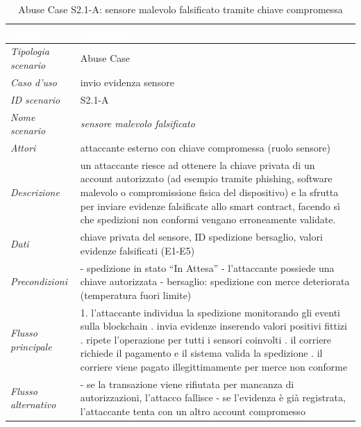 \begin{longtable}{| >{\columncolor{abuseCol}}p{} | p{} |}
\caption{Abuse Case S2.1-A: sensore malevolo falsificato tramite chiave compromessa}\label{tab:s21a}\\
\hline
\rowcolor{abuseHeader} \textcolor{white}{\textit{Campo}} & \textcolor{white}{\textit{Contenuto}} \\
\hline
\textit{Tipologia scenario} & Abuse Case \\
\hline
\textit{Caso d'uso} & invio evidenza sensore \\
\hline
\textit{ID scenario} & S2.1-A \\
\hline
\textit{Nome scenario} & \textit{sensore malevolo falsificato} \\
\hline
\textit{Attori} & attaccante esterno con chiave compromessa (ruolo sensore) \\
\hline
\textit{Descrizione} & un attaccante riesce ad ottenere la chiave privata di un account autorizzato (ad esempio tramite phishing, software malevolo o compromissione fisica del dispositivo) e la sfrutta per inviare evidenze falsificate allo smart contract, facendo sì che spedizioni non conformi vengano erroneamente validate. \\
\hline
\textit{Dati} & chiave privata del sensore, ID spedizione bersaglio, valori evidenze falsificati (E1-E5) \\
\hline
\textit{Precondizioni} & - spedizione in stato ``In Attesa'' \newline - l'attaccante possiede una chiave autorizzata \newline - bersaglio: spedizione con merce deteriorata (temperatura fuori limite) \\
\hline
\textit{Flusso principale} & 1. l'attaccante individua la spedizione monitorando gli eventi sulla blockchain \newline 2. invia evidenze inserendo valori positivi fittizi \newline 3. ripete l'operazione per tutti i sensori coinvolti \newline 4. il corriere richiede il pagamento e il sistema valida la spedizione \newline 5. il corriere viene pagato illegittimamente per merce non conforme \\
\hline
\textit{Flusso alternativo} & - se la transazione viene rifiutata per mancanza di autorizzazioni, l'attacco fallisce \newline - se l'evidenza è già registrata, l'attaccante tenta con un altro account compromesso \\

\end{longtable}
